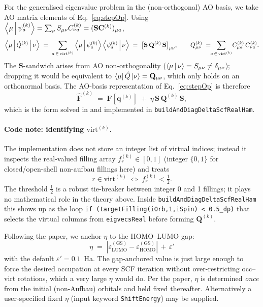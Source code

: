 \documentclass[11pt,a4paper]{article}
\newcommand{\FF}{\mathbf{F}}
\newcommand{\CC}{\mathbf{C}}
\newcommand{\SS}{\mathbf{S}}
\newcommand{\qq}{\mathbf{q}}
\begin{document}
For the generalised eigenvalue problem in the (non-orthogonal) AO
basis, we take AO matrix elements of Eq.~\eqref{eq:stepOp}. Using
$\Braket{\mu|\psi^{(k)}_a}=\sum_\nu S_{\mu\nu}C^{(k)}_{\nu a}=(\SS\CC^{(k)})_{\mu a}$,
\begin{equation}
\Braket{\mu|\hat{Q}^{(k)}|\nu}
\;=\; \sum_{a\,\in\,\mathrm{virt}^{(k)}}
\Braket{\mu|\psi^{(k)}_a}\Braket{\psi^{(k)}_a|\nu}
\;=\; \big[\SS\,\mathbf{Q}^{(k)}\,\SS\big]_{\mu\nu},
\qquad
Q^{(k)}_{\mu\nu}\;=\!\!\sum_{a\,\in\,\mathrm{virt}^{(k)}}\!
C^{(k)}_{\mu a}\,C^{(k)}_{\nu a}.
\end{equation}
The $\SS$-sandwich arises from AO non-orthogonality
($\Braket{\mu|\nu}=S_{\mu\nu}\neq\delta_{\mu\nu}$); dropping it would
be equivalent to $\bra\mu\hat Q\ket\nu=\mathbf Q_{\mu\nu}$, which only
holds on an orthonormal basis. The AO-basis representation of
Eq.~\eqref{eq:stepOp} is therefore
\begin{equation}
\boxed{\widehat{\FF}^{(k)} \;=\; \FF[\qq^{(k)}] \;+\; \eta\,\SS\,\mathbf{Q}^{(k)}\,\SS,}
\label{eq:step}
\end{equation}
which is the form solved in \cite[Eq.~6]{CarterFenkHerbert2020} and
implemented in \texttt{buildAndDiagDeltaScfRealHam}.

\paragraph{Code note: identifying $\mathrm{virt}^{(k)}$.}
The implementation does not store an integer list of virtual indices;
instead it inspects the real-valued filling array
$f^{(k)}_r\in[0,1]$ (integer $\{0,1\}$ for closed/open-shell
non-aufbau fillings here) and treats
\begin{equation}
r\in\mathrm{virt}^{(k)} \;\Longleftrightarrow\; f^{(k)}_r<\tfrac12.
\end{equation}
The threshold $\tfrac12$ is a robust tie-breaker between integer 0 and
1 fillings; it plays no mathematical role in the theory above. Inside
\texttt{buildAndDiagDeltaScfRealHam} this shows up as the loop
\texttt{if (targetFilling(iOrb,1,iSpin) < 0.5\_dp)} that selects the
virtual columns from \texttt{eigvecsReal} before forming
$\mathbf{Q}^{(k)}$.

Following the paper, we anchor $\eta$ to the HOMO--LUMO gap:
\begin{equation}
\eta \;=\; |\varepsilon_\mathrm{LUMO}^{(\mathrm{GS})}
           -\varepsilon_\mathrm{HOMO}^{(\mathrm{GS})}| \,+\, \varepsilon'
\label{eq:stepEta}
\end{equation}
with the default $\varepsilon'=0.1$~Ha. The gap-anchored value is
just large enough to force the desired occupation at every SCF
iteration without over-restricting occ--virt rotations, which a very
large $\eta$ would do. Per the paper, $\eta$ is determined \emph{once}
from the initial (non-Aufbau) orbitals and held fixed thereafter.
Alternatively a user-specified fixed $\eta$ (input keyword
\texttt{ShiftEnergy}) may be supplied.
\end{document}
